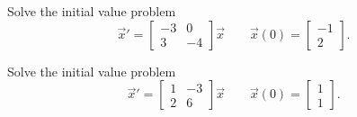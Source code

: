 \documentclass{ximera}
\begin{document}
\begin{exercise}
    Solve the initial value problem
    \[ 
        {\vec{x}}' = 
        \begin{bmatrix} 
            -3 & 0 \\ 
            3 & -4 
        \end{bmatrix} 
        \vec{x} \qquad \vec{x}(0) = 
        \begin{bmatrix} 
            -1 \\ 
            2 
        \end{bmatrix}. 
    \]
\end{exercise}

\begin{exercise}
    Solve the initial value problem
    \[ 
        {\vec{x}}' = 
        \begin{bmatrix} 
            1 & -3 \\ 
            2 & 6 
        \end{bmatrix} 
        \vec{x} \qquad \vec{x}(0) = 
        \begin{bmatrix} 
            1 \\ 
            1 
        \end{bmatrix}. 
    \]
\end{exercise}
\end{document}
